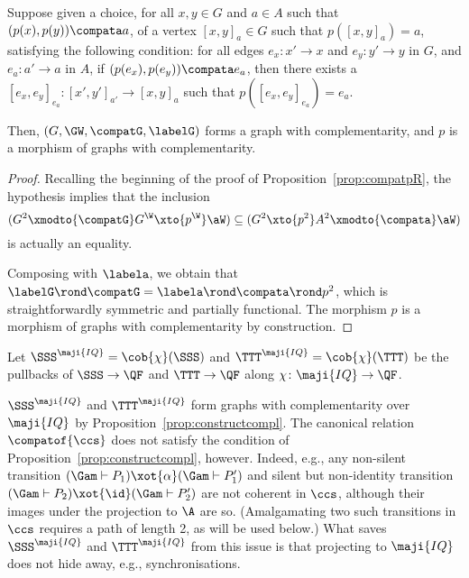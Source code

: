 \documentclass{LMCS}
\renewcommand{\QFI}{\maji{IQ}}
\renewcommand{\LLL}{\QFI}
\renewcommand{\SSSL}{\SSS^{\LLL}}
\renewcommand{\TTTL}{\TTT^{\LLL}}
\theoremstyle{plain}\newtheorem{satz}[thm]{Satz}
\begin{document}
    \begin{prop}\label{prop:constructcompl} Suppose given a choice, for all $x, y \in G$ and $a
      \in A$ such that $(p(x),p(y)) \compata a$, of a vertex $[x,y]_a
      \in G$ such that $p([x,y]_a) = a$, satisfying the following
      condition: for all edges $e_x \colon x' \to x$ and $e_y \colon
      y' \to y$ in $G$, and $e_a \colon a' \to a$ in $A$, if
      $(p(e_x),p(e_y)) \compata e_a$, then there exists a
      $[e_x,e_y]_{e_a} \colon [x',y']_{a'} \to [x,y]_a$ such that
      $p([e_x,e_y]_{e_a}) = e_a$.

      Then, $(G,\GW,\compatG,\labelG)$ forms a graph with
      complementarity, and $p$ is a morphism of graphs with
      complementarity.
  \end{prop}
  \begin{proof}
    Recalling the beginning of the proof of Proposition~\ref{prop:compatpR},
    the hypothesis implies that the inclusion
    $$(G^2 \xmodto{\compatG} G^\W \xto{p^\W} \aW) \subseteq (G^2 \xto{p^2} A^2 \xmodto{\compata} \aW)$$
    is actually an equality.
    
    Composing with $\labela$, we obtain that $\labelG \rond \compatG
    = \labela \rond \compata \rond p^2$, which is straightforwardly
    symmetric and partially functional. The morphism $p$ is a morphism
    of graphs with complementarity by construction.
\end{proof}


\begin{defi}
  Let $\SSSL = \cob{\chi}(\SSS)$ and $\TTTL = \cob{\chi} (\TTT)$ be
  the pullbacks of $\SSS \to \QF$ and $\TTT \to \QF$ along $\chi \colon \LLL \to
  \QF$.   
\end{defi}

\begin{exa}
  $\SSSL$ and $\TTTL$ form graphs with complementarity over $\QFI$ by
  Proposition~\ref{prop:constructcompl}.  The canonical relation
  $\compatof{\ccs}$ does not satisfy the condition of
  Proposition~\ref{prop:constructcompl}, however. Indeed, e.g., any
  non-silent transition $(\Gam \vdash P_1) \xot{\alpha} (\Gam \vdash
  P'_1)$ and silent but non-identity transition $(\Gam \vdash P_2)
  \xot{\id} (\Gam \vdash P'_2)$ are not coherent in $\ccs$, although
  their images under the projection to $\A$ are so.  (Amalgamating two
  such transitions in $\ccs$ requires a path of length 2, as will be
  used below.) What saves $\SSSL$ and $\TTTL$ from this issue is that
  projecting to $\QFI$ does not hide away, e.g., synchronisations.
\end{exa}
\end{document}
